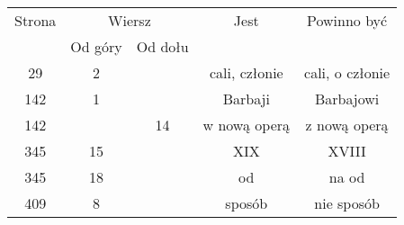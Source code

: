 \documentclass[a4paper,11pt]{article}
\numberwithin{equation}{section}
\begin{document}
\begin{center}

  \begin{tabular}{|c|c|c|c|c|}
    \hline
    Strona & \multicolumn{2}{c|}{Wiersz} & Jest
                              & Powinno być \\ \cline{2-3}
    & Od góry & Od dołu & & \\
    \hline
    29  &  2 & & cali, członie & cali, o członie \\
    142 &  1 & & Barbaji & Barbajowi \\
    142 & & 14 & w nową operą & z nową operą \\
    345 & 15 & & XIX & XVIII \\
    345 & 18 & & od & na od \\
    409 &  8 & & sposób & nie sposób \\
    \hline
  \end{tabular}






\end{center}
\end{document}
